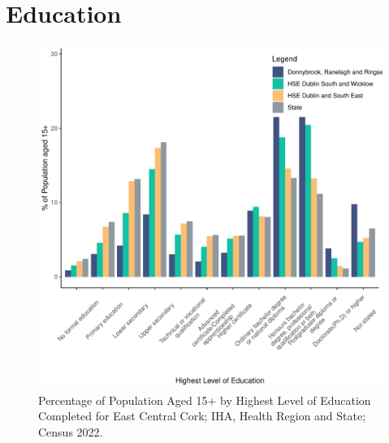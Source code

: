 \documentclass{article}
\begin{document}
\section{Education}\label{sect:Edu}
\begin{figure}[H]
	\centering
	\includegraphics[width = 120mm]{../figures/EduED.pdf}
	\caption{Percentage of Population Aged 15+ by Highest Level of Education Completed for East Central Cork; IHA, Health Region and State; Census 2022.}
	\label{fig:vbnv}
	\end{figure}
\end{document}
